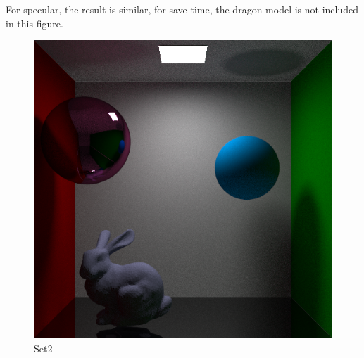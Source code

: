 \documentclass[acmtog]{acmart}
\begin{document}
For specular, the result is similar, for save time, the dragon model is not included in this figure.
\begin{figure}[h]
  \centering
  \includegraphics[scale=0.35]{images/spec_mis_4096.png}
  \caption{Set2}
\end{figure}
\end{document}
